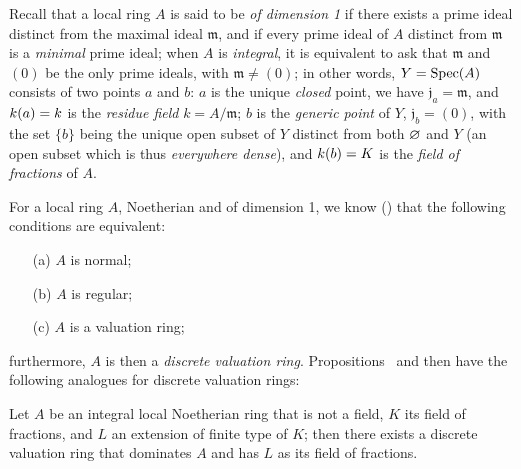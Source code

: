 \begin{env}[7.1.5]
\label{II.7.1.5}
Recall that a local ring $A$ is said to be \emph{of dimension 1} if there exists a prime ideal distinct from the maximal ideal $\mathfrak{m}$, and if every prime ideal of $A$ distinct from $\mathfrak{m}$ is a \emph{minimal} prime ideal;
when $A$ is \emph{integral}, it is equivalent to ask that $\mathfrak{m}$ and $(0)$ be the only prime ideals, with $\mathfrak{m}\neq(0)$;
in other words, $Y=\operatorname{Spec}(A)$ consists of two
points $a$ and $b$: $a$ is the unique \emph{closed} point, we have $\mathfrak{j}_a=\mathfrak{m}$, and $k(a)=k$ is the \emph{residue field} $k=A/\mathfrak{m}$;
$b$ is the \emph{generic point} of $Y$, $\mathfrak{j}_b=(0)$, with the set $\{b\}$ being the unique open subset of $Y$ distinct from both $\varnothing$ and $Y$ (an open subset which is thus \emph{everywhere dense}), and $k(b)=K$ is the \emph{field of fractions} of $A$.
\end{env}

\begin{env}[7.1.6]
\label{II.7.1.6}
For a local ring $A$, Noetherian and of dimension 1, we know (\cite[pp.~2-08 and 17-01]{I-1}) that the following conditions are equivalent:
\begin{enumerate}
    \item[(a)] $A$ is normal;
    \item[(b)] $A$ is regular;
    \item[(c)] $A$ is a valuation ring;
\end{enumerate}
furthermore, $A$ is then a \emph{discrete valuation ring}.
Propositions~ and  then have the following analogues for discrete valuation rings:
\end{env}

\begin{proposition}[7.1.7]
\label{II.7.1.7}
Let $A$ be an integral local Noetherian ring that is not a field, $K$ its field of fractions, and $L$ an extension of finite type of $K$;
then there exists a discrete valuation ring that dominates $A$ and has $L$ as its field of fractions.
\end{proposition}

